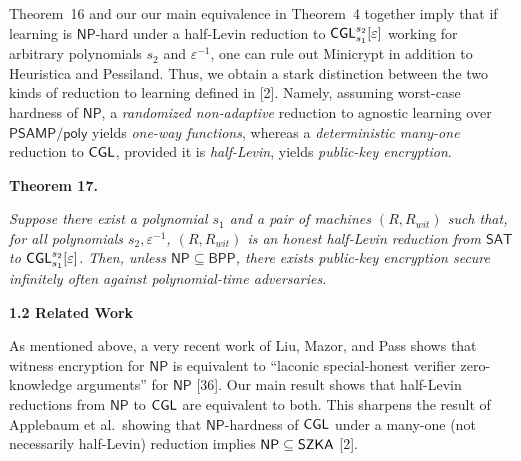 Theorem 16 and our our main equivalence in Theorem 4 together imply that if learning is ${\mathsf{NP}}$-hard under a half-Levin reduction to ${\sf CGL}_{s_{1}}^{s_{2}}[\varepsilon]$ working for arbitrary polynomials $s_{2}$ and $\varepsilon^{-1}$, one can rule out Minicrypt in addition to Heuristica and Pessiland. Thus, we obtain a stark distinction between the two kinds of reduction to learning defined in [2]. Namely, assuming worst-case hardness of ${\mathsf{NP}}$, a \emph{randomized non-adaptive} reduction to agnostic learning over ${\mathsf{P}}{\mathsf{SAMP}}/{\mathsf{poly}}$ yields \emph{one-way functions}, whereas a \emph{deterministic many-one} reduction to ${\sf CGL}$, provided it is \emph{half-Levin}, yields \emph{public-key encryption}.\par





\par\medskip\noindent\textbf{
\textbf{Theorem 17}\textbf{.}
}\par



\emph{Suppose there exist a polynomial $s_{1}$ and a pair of machines $(R,R_{wit})$ such that, for all polynomials $s_{2},\varepsilon^{-1}$, $(R,R_{wit})$ is an honest half-Levin reduction from ${\mathsf{SAT}}$ to ${\sf CGL}^{s_{2}}_{s_{1}}[\varepsilon]$. Then, unless ${\mathsf{NP}}\subseteq{\mathsf{BPP}}$, there exists public-key encryption secure infinitely often against polynomial-time adversaries.}\par








\par\medskip\noindent\textbf{
1.2 Related Work}\par




As mentioned above, a very recent work of Liu, Mazor, and Pass shows that witness encryption for ${\mathsf{NP}}$ is equivalent to “laconic special-honest
verifier zero-knowledge arguments” for ${\mathsf{NP}}$ [36]. Our main result shows that half-Levin reductions from ${\mathsf{NP}}$ to ${\sf CGL}$ are equivalent to both. This sharpens the result of Applebaum et al. showing that ${\mathsf{NP}}$-hardness of ${\sf CGL}$ under a many-one (not necessarily half-Levin) reduction implies ${\mathsf{NP}}\subseteq{\sf SZKA}$ [2].\par




